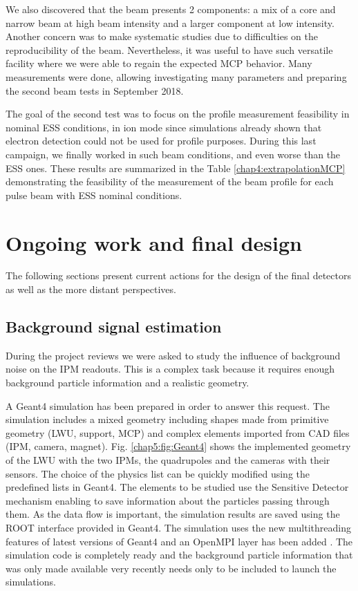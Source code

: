 We also discovered that the beam presents 2 components: a mix of a core and narrow beam at high beam intensity and a larger component at low intensity. Another concern was to make systematic studies due to difficulties on the reproducibility of the beam. Nevertheless, it was useful to have such versatile facility where we were able to regain the expected MCP behavior. Many measurements were done, allowing investigating many parameters and preparing the second beam tests in September 2018.

The goal of the second test was to focus on the profile measurement feasibility in nominal ESS conditions, in ion mode since simulations already shown that electron detection could not be used for profile purposes. During this last campaign, we finally worked in such beam conditions, and even worse than the ESS ones. These results are summarized in the Table \ref{chap4:extrapolationMCP} demonstrating the feasibility of the measurement of the beam profile for each pulse beam with ESS nominal conditions.

\section*{Ongoing work and final design}

The following sections present current actions for the design of the final detectors as well as the more distant perspectives.
%
\subsection*{Background signal estimation}

During the project reviews we were asked to study the influence of background noise on the IPM readouts. This is a complex task because it requires enough background particle information  and a realistic geometry.

A Geant4 simulation has been prepared in order to answer this request. The simulation includes a mixed geometry including shapes made from primitive geometry (LWU, support, MCP) and complex elements imported from CAD files (IPM, camera, magnet). Fig. \ref{chap5:fig:Geant4} shows the implemented geometry of the LWU with the two IPMs, the quadrupoles and the cameras with their sensors. The choice of the physics list can be quickly modified using the predefined lists in Geant4. The elements to be studied use the Sensitive Detector mechanism enabling to save information about the particles passing through them. As the data flow is important, the simulation results are saved using the ROOT interface provided in Geant4. The simulation uses the new multithreading features of latest versions of Geant4 and an OpenMPI layer has been added \cite{Allison2006,Dotti2016}. The simulation code is completely ready and the background particle information that was only made available very recently needs only to be included to launch the simulations.

